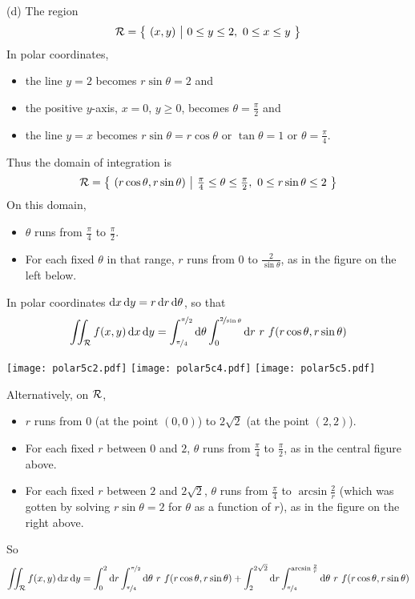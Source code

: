 \begin{solution}
(d) The region 
\begin{equation*}
\mathcal{R}=\big\{ \ (x,y)\ \big|\ 0\le y\le 2,\ 0\le x\le y\ \big\}
\end{equation*}
In polar coordinates, 
\begin{itemize}
\item
the line $y=2$ becomes $r\sin\theta=2$ and 
\item
the positive $y$-axis, $x=0$, $y\ge0$,  becomes $\theta=\frac{\pi}{2}$ and
\item
the line $y=x$ becomes $r\sin\theta=r\cos\theta$ or $\tan\theta=1$ 
or $\theta=\frac{\pi}{4}$.  
\end{itemize}
Thus the domain of integration is
\begin{equation*}
\cR=\Set{(r\cos\theta,r\sin\theta)}{\tfrac{\pi}{4}\le\theta\le\tfrac{\pi}{2},\ 
          0\le r\sin\theta\le 2}
\end{equation*}
On this domain,
\begin{itemize}
\item 
$\theta$ runs from $\frac{\pi}{4}$ to $\frac{\pi}{2}$. 
\item
For each fixed $\theta$ in that range, $r$ runs from $0$ to 
$\frac{2}{\sin\theta}$, as in the figure on the left below.
\end{itemize}
In polar coordinates $\mathrm{d}x\,\mathrm{d}y = r\,\mathrm{d}r\,\mathrm{d}\theta$, so that
\begin{equation*}
\dblInt_\cR f(x,y)\,\dee{x}\,\dee{y}
=\int_{\nicefrac{\pi}{4}}^{\nicefrac{\pi}{2}}\dee{\theta}
 \int_0^{\nicefrac{2}{\sin\theta}}\dee{r}\ r\ f(r\cos\theta,r\sin\theta)
\end{equation*}
\begin{center}
     \texttt{[image: polar5c2.pdf]}\quad
     \texttt{[image: polar5c4.pdf]}\quad
     \texttt{[image: polar5c5.pdf]}
\end{center}
Alternatively, on $\mathcal{R}$,
\begin{itemize}
\item 
$r$ runs from $0$ (at the point $(0,0)$)  
to $2\sqrt{2}$ (at the point $(2,2)$). 
\item
For each fixed $r$ between $0$ and $2$, $\theta$ runs from $\frac{\pi}{4}$ 
to $\frac{\pi}{2}$, as in the central figure above.
\item
For each fixed $r$ between $2$ and $2\sqrt{2}$, $\theta$ runs 
from $\frac{\pi}{4}$ to $\arcsin\frac{2}{r}$ (which was gotten by solving 
$r\sin\theta=2$ for $\theta$ as a function of $r$), as in the figure 
on the right above.
\end{itemize}
So 
\begin{equation*}
\iint_{\mathcal{R}} f(x,y)\,\mathrm{d}x\,\mathrm{d}y
=\int_0^2\mathrm{d}r
  \int_{\nicefrac{\pi}{4}}^{\nicefrac{\pi}{2}}\mathrm{d}\theta
 \ r\ f(r\cos\theta,r\sin\theta)
+\int_2^{2\sqrt{2}}\mathrm{d}r
  \int_{\nicefrac{\pi}{4}}^{\arcsin\frac{2}{r}}\mathrm{d}\theta
 \ r\ f(r\cos\theta,r\sin\theta)
\end{equation*}

\end{solution}


